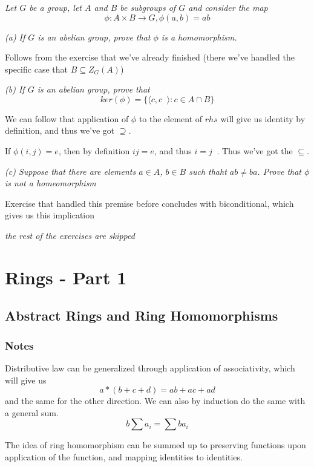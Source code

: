 \documentclass[11pt,oneside,titlepage]{book}
\DeclareMathOperator \inv {^{-1}}
\newcommand{\eangle}[1]{\langle #1 \rangle}
\newcommand{\set}[1]{\{ #1 \}}
\begin{document}
\subsection{}

\textit{Let $G$ be a group, let $A$ and $B$ be subgroups of $G$ and
  consider the map
  $$\phi: A \times B \to G, \phi(a, b) = ab$$}

\textit{(a) If $G$ is an abelian group, prove that $\phi$ is a
  homomorphism.}

Follows from the exercise that we've already finished (there we've handled
the specific case that $B \subseteq Z_G(A)$)

\textit{(b) If $G$ is an abelian group, prove that
  $$ker(\phi) = \set{\eangle{c, c\inv}: c \in A \cap B}$$}

We can follow that application of $\phi$ to the element of $rhs$ will give us
identity by definition, and thus we've got $\supseteq$.

If $\phi(i, j) = e$, then by definition $i j = e$, and thus $i = j\inv$. Thus
we've got the $\subseteq$.

\textit{(c) Suppose that there are elements $a \in A$, $b \in B$ such
thaht $ab \neq ba$.  Prove that $\phi$ is not a homeomorphism}

Exercise that handled this premise before concludes with
biconditional, which gives us this implication

\textit{the rest of the exercises are skipped}

\chapter{Rings - Part 1}

\section{Abstract Rings and Ring Homomorphisms}

\subsection*{Notes}

Distributive law can be generalized through application of
associativity, which will give us
$$a * (b + c + d) = ab + ac + ad$$
and the same for the other direction. We can also by induction
do the same with a general sum.
$$b \sum{a_i} = \sum{b a_i}$$

The idea of ring homomorphism can be summed up to preserving
functions upon application of the function, and mapping identities
to identities.
\end{document}
